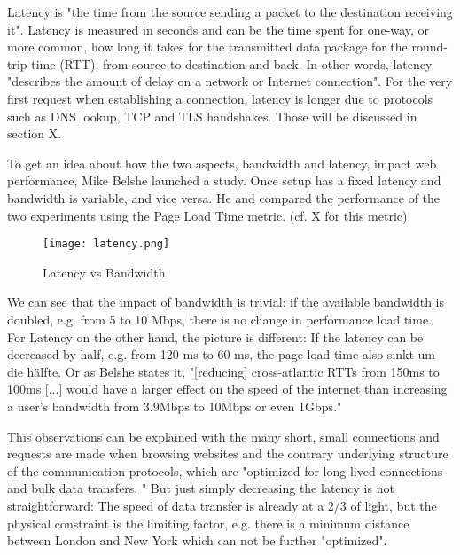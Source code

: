 
Latency is "the time from the source sending a packet to the destination receiving it".  %
Latency is measured in seconds and can be the time spent for one-way, or more common, how long it takes for the transmitted data package for the round-trip time (RTT), from source to destination and back.
In other words, latency "describes the amount of delay on a network or Internet connection". %
For the very first request when establishing a connection, latency is longer due to protocols such as DNS lookup, TCP and TLS handshakes.
Those will be discussed in section X. %



To get an idea about how the two aspects, bandwidth and latency, impact web performance,  Mike Belshe launched a study. %
Once setup has a fixed latency and bandwidth is variable, and vice versa.
He and compared the performance of the two experiments using the Page Load Time metric. (cf. X for this metric)


\begin{figure}[h!]
\begin{center}
\texttt{[image: latency.png]}
\caption{Latency vs Bandwidth}
\label{img:latency}
\end{center}
\end{figure}


We can see that the impact of bandwidth is trivial: if the available bandwidth is doubled, e.g. from 5 to 10 Mbps, there is no change in performance load time.
For Latency on the other hand, the picture is different: If the latency can be decreased by half, e.g. from 120 ms to 60 ms, the page load time also sinkt um die hälfte.
Or as Belshe states it, "[reducing] cross-atlantic RTTs from 150ms to 100ms [...] would have a larger effect on the speed of the internet than increasing a user's bandwidth from 3.9Mbps to 10Mbps or even 1Gbps." %

This observations can be explained with the many short, small connections and requests are made when browsing websites and the contrary underlying structure of the communication protocols, which are "optimized for long-lived connections and bulk data transfers. " %
But just simply decreasing the latency is not straightforward: The speed of data transfer is already at a 2/3 of light, but the physical constraint is the limiting factor, e.g. there is a minimum distance between London and New York which can not be further "optimized". %


